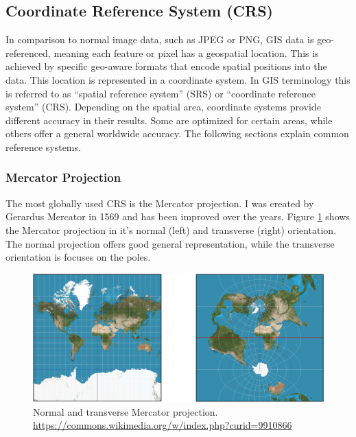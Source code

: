\subsection{Coordinate Reference System (CRS)}
In comparison to normal image data, such as JPEG or PNG, GIS data is geo-referenced, meaning each feature or pixel has a geospatial location. This is achieved by specific geo-aware formats that encode spatial positions into the data. This location is represented in a coordinate system. In GIS terminology this is referred to as \enquote{spatial reference system} (SRS) or \enquote{coordinate reference system} (CRS). Depending on the spatial area, coordinate systems provide different accuracy in their results. Some are optimized for certain areas, while others offer a general worldwide accuracy. The following sections explain common reference systems.

\subsubsection{Mercator Projection}
The most globally used CRS is the Mercator projection. I was created by Gerardus Mercator in 1569 \cite{meer2012atlas} and has been improved over the years. Figure \ref{fig:mercator} shows the Mercator projection in it's normal (left) and transverse (right) orientation. The normal projection offers good general representation, while the transverse orientation is focuses on the poles.
\begin{figure}[H]
	\centering\includegraphics[width=1\textwidth]{res/Mercator}
	\caption{Normal and transverse Mercator projection. \url{https://commons.wikimedia.org/w/index.php?curid=9910866}}
	\label{fig:mercator}
\end{figure}

